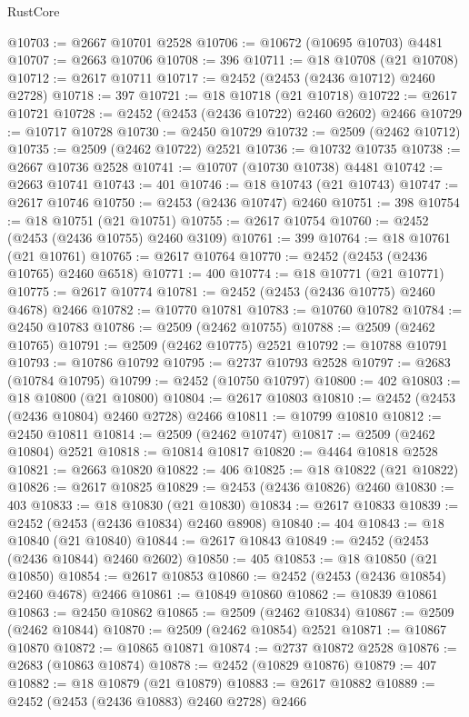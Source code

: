 \begin{lexlean}{RustCore}
\begin{coremodule}
@10703 := @2667 @10701 @2528
@10706 := @10672 (@10695 @10703) @4481
@10707 := @2663 @10706
@10708 := 396
@10711 := @18 @10708 (@21 @10708)
@10712 := @2617 @10711
@10717 := @2452 (@2453 (@2436 @10712) @2460 @2728)
@10718 := 397
@10721 := @18 @10718 (@21 @10718)
@10722 := @2617 @10721
@10728 := @2452 (@2453 (@2436 @10722) @2460 @2602) @2466
@10729 := @10717 @10728
@10730 := @2450 @10729
@10732 := @2509 (@2462 @10712)
@10735 := @2509 (@2462 @10722) @2521
@10736 := @10732 @10735
@10738 := @2667 @10736 @2528
@10741 := @10707 (@10730 @10738) @4481
@10742 := @2663 @10741
@10743 := 401
@10746 := @18 @10743 (@21 @10743)
@10747 := @2617 @10746
@10750 := @2453 (@2436 @10747) @2460
@10751 := 398
@10754 := @18 @10751 (@21 @10751)
@10755 := @2617 @10754
@10760 := @2452 (@2453 (@2436 @10755) @2460 @3109)
@10761 := 399
@10764 := @18 @10761 (@21 @10761)
@10765 := @2617 @10764
@10770 := @2452 (@2453 (@2436 @10765) @2460 @6518)
@10771 := 400
@10774 := @18 @10771 (@21 @10771)
@10775 := @2617 @10774
@10781 := @2452 (@2453 (@2436 @10775) @2460 @4678) @2466
@10782 := @10770 @10781
@10783 := @10760 @10782
@10784 := @2450 @10783
@10786 := @2509 (@2462 @10755)
@10788 := @2509 (@2462 @10765)
@10791 := @2509 (@2462 @10775) @2521
@10792 := @10788 @10791
@10793 := @10786 @10792
@10795 := @2737 @10793 @2528
@10797 := @2683 (@10784 @10795)
@10799 := @2452 (@10750 @10797)
@10800 := 402
@10803 := @18 @10800 (@21 @10800)
@10804 := @2617 @10803
@10810 := @2452 (@2453 (@2436 @10804) @2460 @2728) @2466
@10811 := @10799 @10810
@10812 := @2450 @10811
@10814 := @2509 (@2462 @10747)
@10817 := @2509 (@2462 @10804) @2521
@10818 := @10814 @10817
@10820 := @4464 @10818 @2528
@10821 := @2663 @10820
@10822 := 406
@10825 := @18 @10822 (@21 @10822)
@10826 := @2617 @10825
@10829 := @2453 (@2436 @10826) @2460
@10830 := 403
@10833 := @18 @10830 (@21 @10830)
@10834 := @2617 @10833
@10839 := @2452 (@2453 (@2436 @10834) @2460 @8908)
@10840 := 404
@10843 := @18 @10840 (@21 @10840)
@10844 := @2617 @10843
@10849 := @2452 (@2453 (@2436 @10844) @2460 @2602)
@10850 := 405
@10853 := @18 @10850 (@21 @10850)
@10854 := @2617 @10853
@10860 := @2452 (@2453 (@2436 @10854) @2460 @4678) @2466
@10861 := @10849 @10860
@10862 := @10839 @10861
@10863 := @2450 @10862
@10865 := @2509 (@2462 @10834)
@10867 := @2509 (@2462 @10844)
@10870 := @2509 (@2462 @10854) @2521
@10871 := @10867 @10870
@10872 := @10865 @10871
@10874 := @2737 @10872 @2528
@10876 := @2683 (@10863 @10874)
@10878 := @2452 (@10829 @10876)
@10879 := 407
@10882 := @18 @10879 (@21 @10879)
@10883 := @2617 @10882
@10889 := @2452 (@2453 (@2436 @10883) @2460 @2728) @2466

\end{coremodule}
\end{lexlean}
